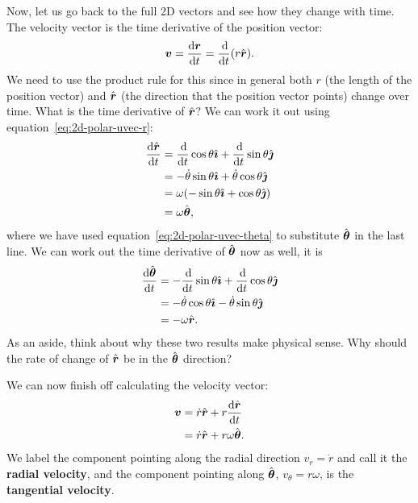 \documentclass[../classical_mechanics.tex]{subfiles}
\begin{document}
        Now, let us go back to the full 2D vectors and see how they change with time.
        The velocity vector is the time derivative of the position vector:
        \begin{equation}
            \vec{v}=\dv{\vec{r}}{t}=\dv{}{t}(r\uvec{r}).
        \end{equation}
        We need to use the product rule for this since in general both $r$ (the length of the position vector) and $\hat{\boldsymbol{r}}$ (the direction that the position vector points) change over time.
        What is the time derivative of $\hat{\boldsymbol{r}}$?
        We can work it out using equation~\ref{eq:2d-polar-uvec-r}:
        \begin{align}
            \dv{\uvec{r}}{t}&=\dv{}{t}\cos\theta\ihat+\dv{}{t}\sin\theta\jhat\\
            &=-\dot{\theta}\sin\theta\ihat+\dot{\theta}\cos\theta\jhat\\
            &=\omega(-\sin\theta\ihat+\cos\theta\jhat)\\
            &=\omega\uvec{\theta}\label{eq:2d-polar-uvec-r-dot},
        \end{align}
        where we have used equation~\ref{eq:2d-polar-uvec-theta} to substitute $\hat{\boldsymbol{\theta}}$ in the last line.
        We can work out the time derivative of $\hat{\boldsymbol{\theta}}$ now as well, it is
        \begin{align}
            \dv{\uvec{\theta}}{t}&=-\dv{}{t}\sin\theta\ihat+\dv{}{t}\cos\theta\jhat\\
            &=-\dot{\theta}\cos\theta\ihat-\dot{\theta}\sin\theta\jhat\\
            &=-\omega\uvec{r}.\label{eq:2d-polar-uvec-theta-dot}
        \end{align}
        As an aside, think about why these two results make physical sense.
        Why should the rate of change of $\hat{\boldsymbol{r}}$ be in the $\hat{\boldsymbol{\theta}}$ direction?

        We can now finish off calculating the velocity vector:
        \begin{align}
            \vec{v}&=\dot{r}\uvec{r}+r\dv{\uvec{r}}{t}\\
            &=\dot{r}\uvec{r}+r\omega\uvec{\theta}.\label{eq:2d-polar-velocity}
        \end{align}
        We label the component pointing along the radial direction $v_r=\dot{r}$ and call it the \textbf{radial velocity}, and the component pointing along $\hat{\boldsymbol{\theta}}$, $v_\theta=r\omega$, is the \textbf{tangential velocity}. 
        
\end{document}
